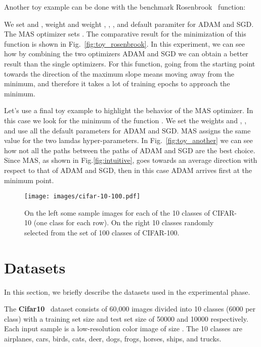 \documentclass[10pt,twocolumn,letterpaper]{article}
\begin{document}
Another toy example can be done with the benchmark Rosenbrook~\cite{rosenbrock1960automatic} function:

We set  and , weight  and weight , , , and default paramiter for ADAM and SGD. 
The MAS optimizer sets .
The comparative result for the minimization of this function is shown in Fig.~\ref{fig:toy_rosenbrook}.
In this experiment, we can see how by combining the two optimizers ADAM and SGD we can obtain a better result than the single optimizers.
For this function, going from the starting point towards the direction of the maximum slope means moving away from the minimum, and therefore it takes a lot of training epochs to approach the minimum.



Let's use a final toy example to highlight the behavior of the MAS optimizer.
In this case we look for the minimum of the function .
We set the weights   and , ,   and use all the default parameters for ADAM and SGD.
MAS assigns the same value   for the two lamdas hyper-parameters.
In Fig.~\ref{fig:toy_another} we can see how not all the paths between the paths of ADAM and SGD are the best choice. 
Since MAS, as shown in Fig.\ref{fig:intuitive}, goes towards an average direction with respect to that of ADAM and SGD, then in this case ADAM arrives first at the minimum point.


\begin{figure}
    \centering
    \texttt{[image: images/cifar-10-100.pdf]}
    \caption{On the left some sample images for each of the 10 classes of CIFAR-10 (one class for each row). On the right 10 classes randomly selected from the set of 100 classes of CIFAR-100.}
    \label{fig:cifar10-100}
\end{figure}


\section{Datasets}
In this section, we briefly describe the datasets used in the experimental phase.

The \textbf{Cifar10}~\cite{cifar} dataset consists of 60,000 images divided into 10 classes (6000 per class) with a training set size and test set size of 50000 and 10000 respectively.
Each input sample is a low-resolution color image of size .
The 10 classes are airplanes, cars, birds, cats, deer, dogs, frogs, horses, ships, and trucks.
\end{document}
